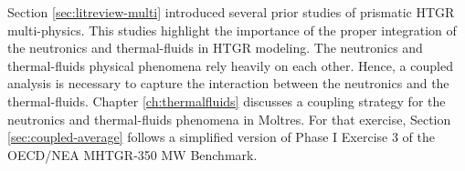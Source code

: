Section \ref{sec:litreview-multi} introduced several prior studies of prismatic HTGR multi-physics.
This studies highlight the importance of the proper integration of the neutronics and thermal-fluids in HTGR modeling.
The neutronics and thermal-fluids physical phenomena rely heavily on each other.
Hence, a coupled analysis is necessary to capture the interaction between the neutronics and the thermal-fluids.
Chapter \ref{ch:thermalfluids} discusses a coupling strategy for the neutronics and thermal-fluids phenomena in Moltres.
For that exercise, Section \ref{sec:coupled-average} follows a simplified version of Phase I Exercise 3 of the OECD/NEA MHTGR-350 MW Benchmark.
